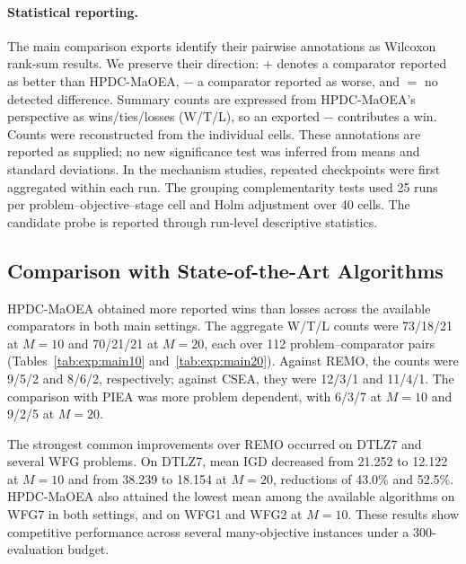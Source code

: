 \paragraph{Statistical reporting.}
The main comparison exports identify their pairwise annotations as Wilcoxon
rank-sum results. We preserve their direction: $+$ denotes a comparator
reported as better than HPDC-MaOEA, $-$ a comparator reported as worse, and
$=$ no detected difference. Summary counts are expressed from HPDC-MaOEA's
perspective as wins/ties/losses (W/T/L), so an exported $-$ contributes a win.
Counts were reconstructed from the individual cells. These annotations are
reported as supplied; no new significance test was inferred from means and
standard deviations. In the mechanism studies, repeated checkpoints were
first aggregated within each run. The grouping complementarity tests used
25 runs per problem--objective--stage cell and Holm adjustment over 40 cells.
The candidate probe is reported through run-level descriptive statistics.


\subsection{Comparison with State-of-the-Art Algorithms}
\label{sec:exp:comparison}

HPDC-MaOEA obtained more reported wins than losses across the available
comparators in both main settings. The aggregate W/T/L counts were
73/18/21 at $M=10$ and 70/21/21 at $M=20$, each over 112 problem--comparator
pairs (Tables~\ref{tab:exp:main10} and~\ref{tab:exp:main20}). Against REMO,
the counts were 9/5/2 and 8/6/2, respectively; against CSEA, they were
12/3/1 and 11/4/1. The comparison with PIEA was more problem dependent,
with 6/3/7 at $M=10$ and 9/2/5 at $M=20$.

The strongest common improvements over REMO occurred on DTLZ7 and several
WFG problems. On DTLZ7, mean IGD decreased from 21.252 to 12.122 at $M=10$
and from 38.239 to 18.154 at $M=20$, reductions of 43.0\% and 52.5\%.
HPDC-MaOEA also attained the lowest mean among the available algorithms on
WFG7 in both settings, and on WFG1 and WFG2 at $M=10$. These results show
competitive performance across several many-objective instances under a
300-evaluation budget.

